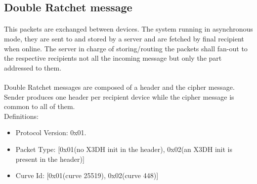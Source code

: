 \documentclass[a4paper,11pt]{article}
\begin{document}
  \subsection{Double Ratchet message}
    \label{subsec:protocol_doubleratchet}
    \paragraph*{}This packets are exchanged between devices. The system running in asynchronous mode, they are sent to and stored by a server and are fetched by final recipient when online. The server in charge of storing/routing the packets shall fan-out to the respective recipients not all the incoming message but only the part addressed to them.

    \paragraph*{}Double Ratchet messages are composed of a header and the cipher message. Sender produces one header per recipient device while the cipher message is common to all of them.\\
      Definitions:
      \begin{itemize}
      \item Protocol Version: 0x01.
      \item Packet Type: [0x01(no X3DH init in the header), 0x02(an X3DH init is present in the header)]
      \item Curve Id: [0x01(curve 25519), 0x02(curve 448)]
      \end{itemize}
\end{document}
